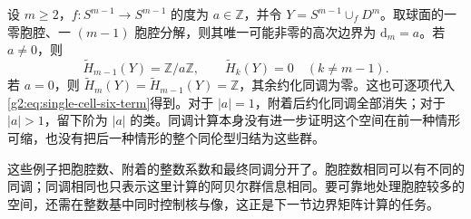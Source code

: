 \begin{example}\label{g2:exm:degree-cell-attachment}
	设 \(m\geq2\)，\(f:S^{m-1}\to S^{m-1}\) 的度为 \(a\in\mathbb Z\)，并令 \(Y=S^{m-1}\cup_fD^m\)。取球面的一零胞腔、一 \((m-1)\) 胞腔分解，则其唯一可能非零的高次边界为 \(\mathrm{d}_m=a\)。若 \(a\ne0\)，则
	\[
		\widetilde H_{m-1}(Y)=\mathbb Z/a\mathbb Z,
		\qquad \widetilde H_k(Y)=0\quad(k\ne m-1).
	\]
	若 \(a=0\)，则 \(\widetilde H_m(Y)=\widetilde H_{m-1}(Y)=\mathbb Z\)，其余约化同调为零。这也可逐项代入\eqref{g2:eq:single-cell-six-term}得到。对于 \(|a|=1\)，附着后约化同调全部消失；对于 \(|a|>1\)，留下阶为 \(|a|\) 的类。同调计算本身没有进一步证明这个空间在前一种情形可缩，也没有把后一种情形的整个同伦型归结为这些群。
\end{example}

这些例子把胞腔数、附着的整数系数和最终同调分开了。胞腔数相同可以有不同的同调；同调相同也只表示这里计算的阿贝尔群信息相同。要可靠地处理胞腔较多的空间，还需在整数基中同时控制核与像，这正是下一节边界矩阵计算的任务。
